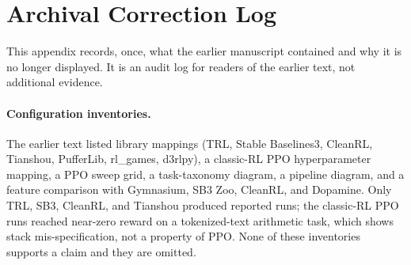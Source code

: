 \documentclass{article}
\begin{document}



\appendix

\section{Archival Correction Log}
\label{app:archive}

This appendix records, once, what the earlier manuscript contained and why it is
no longer displayed. It is an audit log for readers of the earlier text, not
additional evidence.

\paragraph{Configuration inventories.}
The earlier text listed library mappings (TRL, Stable Baselines3, CleanRL,
Tianshou, PufferLib, rl\_games, d3rlpy), a classic-RL PPO hyperparameter
mapping, a PPO sweep grid, a task-taxonomy diagram, a pipeline diagram, and a
feature comparison with Gymnasium, SB3 Zoo, CleanRL, and Dopamine. Only TRL,
SB3, CleanRL, and Tianshou produced reported runs; the classic-RL PPO runs
reached near-zero reward on a tokenized-text arithmetic task, which shows stack
mis-specification, not a property of PPO. None of these inventories supports a
claim and they are omitted.
\end{document}
